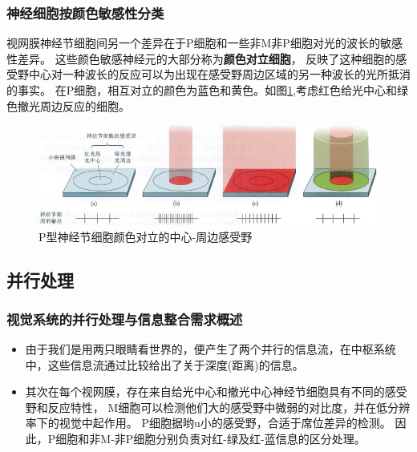 \begin{frame}
    \frametitle{神经细胞按颜色敏感性分类}

    视网膜神经节细胞间另一个差异在于P细胞和一些非M非P细胞对光的波长的敏感性差异。
    这些颜色敏感神经元的大部分称为\textbf{颜色对立细胞}，
    反映了这种细胞的感受野中心对一种波长的反应可以为出现在感受野周边区域的另一种波长的光所抵消的事实。
    在P细胞，相互对立的颜色为蓝色和黄色。如图\ref{pic7-4},考虑红色给光中心和绿色撤光周边反应的细胞。
    \begin{figure}
        \centering
        \includegraphics[width=.8\textwidth]{img/pic7-4.png}
        \caption{P型神经节细胞颜色对立的中心-周边感受野\label{pic7-4}}
    \end{figure}


\end{frame}

\subsection{并行处理}
\begin{frame}
    \frametitle{视觉系统的并行处理与信息整合需求概述}
    \begin{itemize}
        \item 由于我们是用两只眼睛看世界的，便产生了两个并行的信息流，在中枢系统中，这些信息流通过比较给出了关于深度(距离)的信息。
        \item 其次在每个视网膜，存在来自给光中心和撤光中心神经节细胞具有不同的感受野和反应特性，
        M细胞可以检测他们大的感受野中微弱的对比度，并在低分辨率下的视觉中起作用。
        P细胞据哟u小的感受野，合适于席位差异的检测。
        因此，P细胞和非M-非P细胞分别负责对红-绿及红-蓝信息的区分处理。
    \end{itemize}
    

\end{frame}